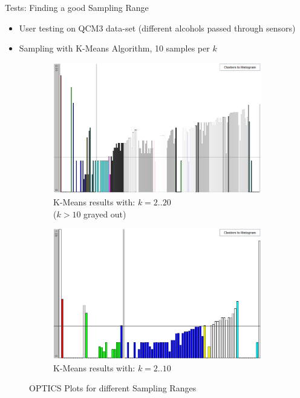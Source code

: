 \documentclass[aspectratio=169]{beamer}
\begin{document}
\begin{frame}{Tests: Finding a good Sampling Range}

	\begin{itemize}
	 	\item User testing on QCM3 data-set (different alcohols passed through sensors)
		\item Sampling with K-Means Algorithm, 10 samples per $k$
	\end{itemize}
	\begin{figure}[h]
		\centering
		\begin{subfigure}[t]{.49\textwidth}
			  \centering
			  \includegraphics[width=.99\linewidth]{user_qcm_optics}
			  \caption{K-Means results with: $k= 2..20$ \\ ($k>10$ grayed out)}
			  \label{fig:user_wifi_consensus}
		\end{subfigure}
		\hfill
		\begin{subfigure}[t]{.49\textwidth}
			  \centering
			  \includegraphics[width=.99\linewidth]{user_qcm_optics2}
			  \caption{K-Means results with: $k= 2..10$}
			  \label{fig:user_wifi_best}
		\end{subfigure}
		
		\caption{OPTICS Plots for different Sampling Ranges}
		\label{fig:user_wifi}
	\end{figure}
\end{frame}
\end{document}
